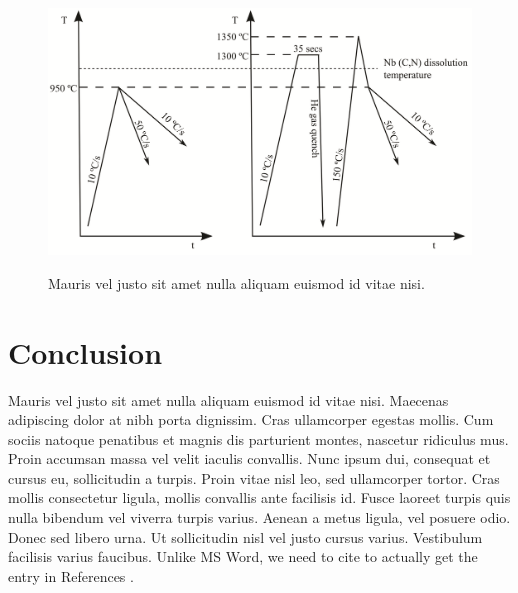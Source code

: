 \begin{figure}[h]
\centering
\includegraphics[scale=1]{Images/figure1.png}
\label{fig:figure1}
\caption{Mauris vel justo sit amet nulla aliquam euismod id vitae nisi.}
\end{figure}

\section*{Conclusion}
Mauris vel justo sit amet nulla aliquam euismod id vitae nisi. Maecenas adipiscing dolor at nibh porta dignissim. Cras ullamcorper egestas mollis. Cum sociis natoque penatibus et magnis dis parturient montes, nascetur ridiculus mus. Proin accumsan massa vel velit iaculis convallis. Nunc ipsum dui, consequat et cursus eu, sollicitudin a turpis. Proin vitae nisl leo, sed ullamcorper tortor. Cras mollis consectetur ligula, mollis convallis ante facilisis id. Fusce laoreet turpis quis nulla bibendum vel viverra turpis varius. Aenean a metus ligula, vel posuere odio. Donec sed libero urna. Ut sollicitudin nisl vel justo cursus varius. Vestibulum facilisis varius faucibus. Unlike MS Word, we need to cite to actually get the entry in References \cite{Anderson1978, Moore1981}.